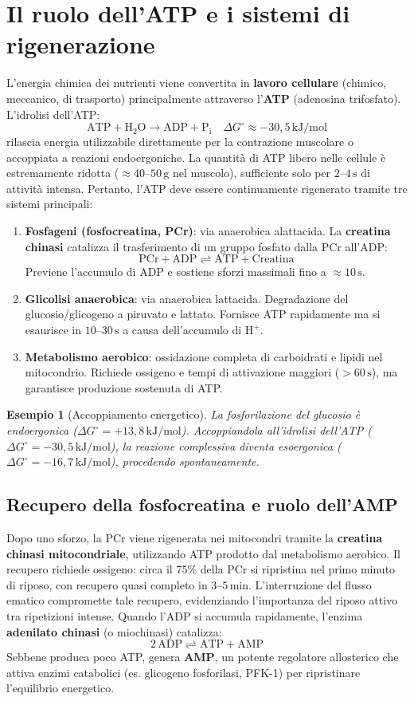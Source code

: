 \documentclass[12pt,a4paper]{report}
\newtheorem{esempio}{Esempio}[section]
\begin{document}
\section{Il ruolo dell'ATP e i sistemi di rigenerazione}
L'energia chimica dei nutrienti viene convertita in \textbf{lavoro cellulare} (chimico, meccanico, di trasporto) principalmente attraverso l'\textbf{ATP} (adenosina trifosfato). L'idrolisi dell'ATP:
\[
\mathrm{ATP + H_2O \rightarrow ADP + P_i} \quad \Delta G^\circ \approx -30{,}5\,\mathrm{kJ/mol}
\]
rilascia energia utilizzabile direttamente per la contrazione muscolare o accoppiata a reazioni endoergoniche. La quantità di ATP libero nelle cellule è estremamente ridotta (\(\approx 40\text{--}50\,\mathrm{g}\) nel muscolo), sufficiente solo per \(2\text{--}4\,\mathrm{s}\) di attività intensa. Pertanto, l'ATP deve essere continuamente rigenerato tramite tre sistemi principali:
\begin{enumerate}
\item \textbf{Fosfageni (fosfocreatina, PCr)}: via anaerobica alattacida. La \textbf{creatina chinasi} catalizza il trasferimento di un gruppo fosfato dalla PCr all'ADP:
\[
\mathrm{PCr + ADP \rightleftharpoons ATP + Creatina}
\]
Previene l'accumulo di ADP e sostiene sforzi massimali fino a \(\approx 10\,\mathrm{s}\).
\item \textbf{Glicolisi anaerobica}: via anaerobica lattacida. Degradazione del glucosio/glicogeno a piruvato e lattato. Fornisce ATP rapidamente ma si esaurisce in \(10\text{--}30\,\mathrm{s}\) a causa dell'accumulo di \(\mathrm{H^+}\).
\item \textbf{Metabolismo aerobico}: ossidazione completa di carboidrati e lipidi nel mitocondrio. Richiede ossigeno e tempi di attivazione maggiori (\(>60\,\mathrm{s}\)), ma garantisce produzione sostenuta di ATP.
\end{enumerate}
\begin{esempio}[Accoppiamento energetico]
La fosforilazione del glucosio è endoergonica (\(\Delta G^\circ = +13{,}8\,\mathrm{kJ/mol}\)). Accoppiandola all'idrolisi dell'ATP (\(\Delta G^\circ = -30{,}5\,\mathrm{kJ/mol}\)), la reazione complessiva diventa esoergonica (\(\Delta G^\circ = -16{,}7\,\mathrm{kJ/mol}\)), procedendo spontaneamente.
\end{esempio}
\subsection{Recupero della fosfocreatina e ruolo dell'AMP}
Dopo uno sforzo, la PCr viene rigenerata nei mitocondri tramite la \textbf{creatina chinasi mitocondriale}, utilizzando ATP prodotto dal metabolismo aerobico. Il recupero richiede ossigeno: circa il 75\% della PCr si ripristina nel primo minuto di riposo, con recupero quasi completo in \(3\text{--}5\,\mathrm{min}\). L'interruzione del flusso ematico compromette tale recupero, evidenziando l'importanza del riposo attivo tra ripetizioni intense.
Quando l'ADP si accumula rapidamente, l'enzima \textbf{adenilato chinasi} (o miochinasi) catalizza:
\[
\mathrm{2\,ADP \rightleftharpoons ATP + AMP}
\]
Sebbene produca poco ATP, genera \textbf{AMP}, un potente regolatore allosterico che attiva enzimi catabolici (es. glicogeno fosforilasi, PFK-1) per ripristinare l'equilibrio energetico.
\end{document}
